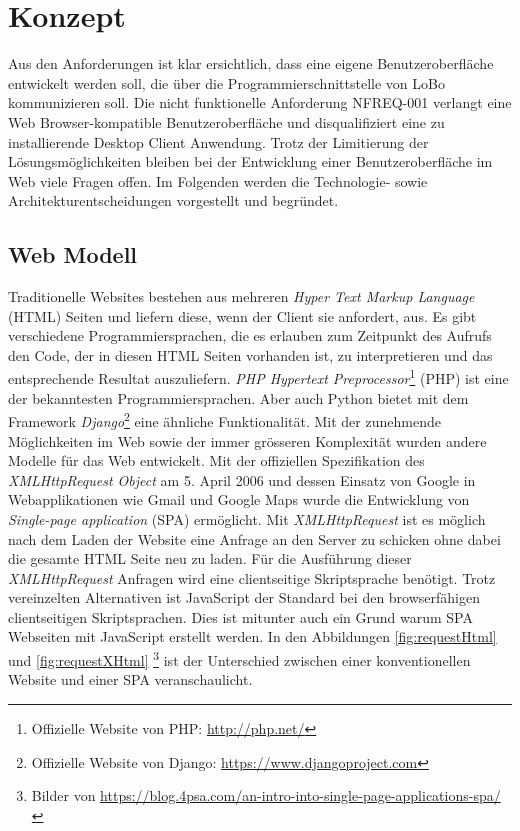\chapter{Konzept}
\label{sec:konzept}
Aus den Anforderungen ist klar ersichtlich, dass eine eigene Benutzeroberfläche entwickelt werden soll, die über die Programmierschnittstelle von LoBo kommunizieren soll. Die nicht funktionelle Anforderung NFREQ-001 verlangt eine Web Browser-kompatible Benutzeroberfläche und disqualifiziert eine zu installierende Desktop Client Anwendung. Trotz der Limitierung der Lösungsmöglichkeiten bleiben bei der Entwicklung einer Benutzeroberfläche im Web viele Fragen offen. Im Folgenden werden die Technologie- sowie Architekturentscheidungen vorgestellt und begründet.

\section{Web Modell}
Traditionelle Websites bestehen aus mehreren \textit{Hyper Text Markup Language} (HTML) Seiten und liefern diese, wenn der Client sie anfordert, aus. Es gibt verschiedene Programmiersprachen, die es erlauben zum Zeitpunkt des Aufrufs den Code, der in diesen HTML Seiten vorhanden ist, zu interpretieren und das entsprechende Resultat auszuliefern. \textit{PHP Hypertext Preprocessor}\footnote{Offizielle Website von PHP: \url{http://php.net/}} (PHP) ist eine der bekanntesten Programmiersprachen. Aber auch Python bietet mit dem Framework \textit{Django}\footnote{Offizielle Website von Django: \url{https://www.djangoproject.com}} eine ähnliche Funktionalität. Mit der zunehmende Möglichkeiten im Web sowie der immer grösseren Komplexität wurden andere Modelle für das Web entwickelt. Mit der offiziellen Spezifikation des \textit{XMLHttpRequest Object} am 5. April 2006 \citep[]{w3cXMLHttpRequest} und dessen Einsatz von Google in Webapplikationen wie Gmail und Google Maps wurde die Entwicklung von \textit{Single-page application} (SPA) ermöglicht. Mit \textit{XMLHttpRequest} ist es möglich nach dem Laden der Website eine Anfrage an den Server zu schicken ohne dabei die gesamte HTML Seite neu zu laden. Für die Ausführung dieser \textit{XMLHttpRequest} Anfragen wird eine clientseitige Skriptsprache benötigt. Trotz vereinzelten Alternativen ist JavaScript der Standard bei den browserfähigen clientseitigen Skriptsprachen. Dies ist mitunter auch ein Grund warum SPA Webseiten mit JavaScript erstellt werden. In den Abbildungen  \ref{fig:requestHtml} und \ref{fig:requestXHtml} \footnote{Bilder von \url{https://blog.4psa.com/an-intro-into-single-page-applications-spa/}} ist der Unterschied zwischen einer konventionellen Website und einer SPA veranschaulicht.

